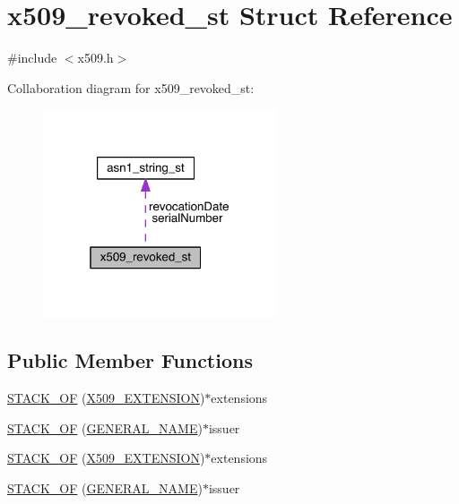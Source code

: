 \hypertarget{structx509__revoked__st}{}\section{x509\+\_\+revoked\+\_\+st Struct Reference}
\label{structx509__revoked__st}


{\ttfamily \#include $<$x509.\+h$>$}



Collaboration diagram for x509\+\_\+revoked\+\_\+st\+:\nopagebreak
\begin{figure}[H]
\begin{center}
\leavevmode
\includegraphics[width=196pt]{structx509__revoked__st__coll__graph}
\end{center}
\end{figure}
\subsection*{Public Member Functions}
\begin{DoxyCompactItemize}
\item 
\hyperlink{structx509__revoked__st_a9674726b03b076fb4ef08b04c1417a0d}{S\+T\+A\+C\+K\+\_\+\+OF} (\hyperlink{crypto_2x509_2x509_8h_ab2f7f7dc0ced8684e0cbfc818e408304}{X509\+\_\+\+E\+X\+T\+E\+N\+S\+I\+ON})$\ast$extensions
\item 
\hyperlink{structx509__revoked__st_af157a0c20f6be28c7c7ac746d2ead242}{S\+T\+A\+C\+K\+\_\+\+OF} (\hyperlink{crypto_2x509v3_2x509v3_8h_a6688fb8a0c7b8e63f3d47bac3a09eb15}{G\+E\+N\+E\+R\+A\+L\+\_\+\+N\+A\+ME})$\ast$issuer
\item 
\hyperlink{structx509__revoked__st_a9674726b03b076fb4ef08b04c1417a0d}{S\+T\+A\+C\+K\+\_\+\+OF} (\hyperlink{crypto_2x509_2x509_8h_ab2f7f7dc0ced8684e0cbfc818e408304}{X509\+\_\+\+E\+X\+T\+E\+N\+S\+I\+ON})$\ast$extensions
\item 
\hyperlink{structx509__revoked__st_af157a0c20f6be28c7c7ac746d2ead242}{S\+T\+A\+C\+K\+\_\+\+OF} (\hyperlink{crypto_2x509v3_2x509v3_8h_a6688fb8a0c7b8e63f3d47bac3a09eb15}{G\+E\+N\+E\+R\+A\+L\+\_\+\+N\+A\+ME})$\ast$issuer
\end{DoxyCompactItemize}
